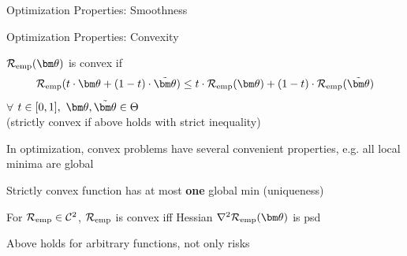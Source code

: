 \documentclass[11pt,compress,t,notes=noshow, xcolor=table]{beamer}
\begin{document}
\begin{frame}{Optimization Properties: Smoothness}


\end{frame}


\begin{framei}[sep=L]{Optimization Properties: Convexity}

\item $\risket$ is convex if
$$
\riske(t \cdot \thetav + (1 - t) \cdot \tilde \thetav) \le t \cdot
\riske(\thetav) + (1 - t) \cdot \riske(\tilde \thetav )
$$
$\forall$ $t \in [0, 1], ~\thetav, \tilde \thetav \in \Theta$\\
(strictly convex if above holds with strict inequality)

\item In optimization, convex problems have several convenient properties, e.g. all local minima are global 
\item Strictly convex function has at most \textbf{one} global min (uniqueness)

\item For $\mathcal{R}_{\text{emp}} \in \mathcal{C}^{2}$, $\mathcal{R}_{\text{emp}}$ is convex iff Hessian $\nabla^2 \risket$ is psd

\item Above holds for arbitrary functions, not only risks

\end{framei}
\end{document}
